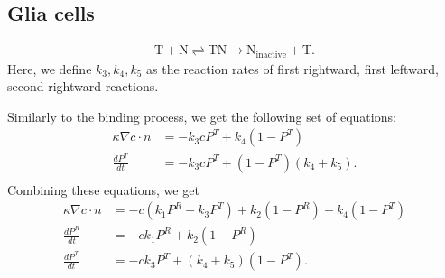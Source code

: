 \subsection{Glia cells}
\begin{align*}
\text{T} + \text{N} \rightleftharpoons \text{TN} \rightarrow \text{N}_{\text{inactive}} + \text{T}.
\end{align*}
Here, we define $k_3, k_4, k_5$ as the reaction rates of first rightward, first leftward, second rightward reactions.

Similarly to the binding process, we get the following set of equations:
\begin{align*}
\kappa \nabla c \cdot n &= -k_3c P^T + k_4(1-P^T)\\
\frac{dP^T}{dt} &= -k_3c P^T + (1-P^T)(k_4 + k_5).\\
\end{align*}
Combining these equations, we get
\begin{align*}
\kappa \nabla c \cdot n &= -c(k_1 P^R + k_3 P^T) + k_2 (1-P^R) + k_4 (1-P^T)    \\
\frac{dP^R}{dt} &= -ck_1 P^R + k_2(1-P^R)\\
\frac{dP^T}{dt} &= -ck_3 P^T + (k_4 + k_5)(1-P^T).\\
\end{align*}

